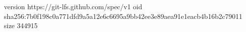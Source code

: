 version https://git-lfs.github.com/spec/v1
oid sha256:7b0f198c0a771dfd9a5a12e6c6695a9bb42ee3e89aea91e1eacb4b16b2c79011
size 344915
